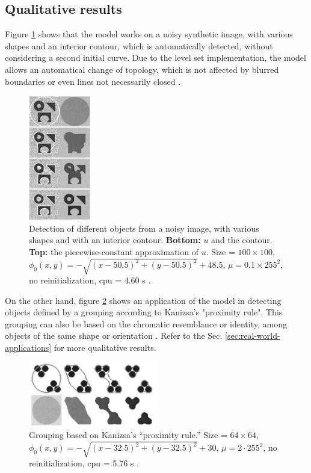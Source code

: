 \documentclass[journal]{IEEEtran}
\begin{document}
\subsection{Qualitative results}

Figure \ref{fig:noisy-detection} shows that the model works on a noisy synthetic image, with various shapes and an interior contour, which is automatically detected, without considering a second initial curve. Due to the level set implementation, the model allows an automatical change of topology, which is not affected by blurred boundaries or even lines not necessarily closed \cite{ChanVese}.

\begin{figure}[!t]
    \centering
    \includegraphics[width=0.24\textwidth,angle=90,origin=c]{images/results-noisy-detection.png}
    \vspace{-6\baselineskip}
    \caption{Detection of different objects from a noisy image, with various shapes and with an interior contour. \textbf{Bottom:} \( u \) and the contour. \textbf{Top:} the piecewise-constant approximation of \( u \). Size = \( 100 \times 100 \), \( \phi_0(x, y) = -\sqrt{(x - 50.5)^2 + (y - 50.5)^2} + 48.5 \), \( \mu = 0.1 \times 255^2 \), no reinitialization, cpu = 4.60 s \cite{ChanVese}.}
    \label{fig:noisy-detection}
\end{figure}
On the other hand, figure \ref{fig:kanizsa} shows an application of the model in detecting objects defined by a grouping according to Kanizsa's "proximity rule". This grouping can also be based on the chromatic resemblance or identity, among objects of the same shape or orientation \cite{ChanVese}. Refer to the Sec. \ref{sec:real-world-applications} for more qualitative results.

\begin{figure}[!t]
    \centering
    \includegraphics[width=0.5\textwidth,keepaspectratio]{images/results-kanizsa.png}
    \caption{Grouping based on Kanizsa's ``proximity rule.'' Size = \(64 \times 64\), \(\phi_0(x, y) = -\sqrt{(x - 32.5)^2 + (y - 32.5)^2} + 30\), \(\mu = 2 \cdot 255^2\), no reinitialization, cpu = 5.76 s \cite{ChanVese}.}
    \label{fig:kanizsa}
\end{figure}
\end{document}
